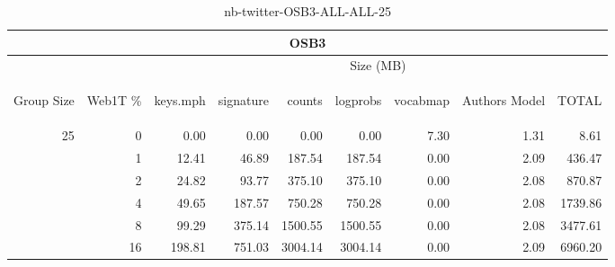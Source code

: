 \begin{center}
\begin{table}[htbp] 
 \begin{center}
\begin{tabular}{ | r | r | r | r | r | r | r | r | r |}
\hline
\multicolumn{9}{|c|}{OSB3}\\
\hline
 & & \multicolumn{7}{|c|}{Size (MB)}\\ \cline{3-9}
\begin{sideways}Group Size\end{sideways} & \begin{sideways}Web1T \% \end{sideways} & \begin{sideways}keys.mph\end{sideways} & \begin{sideways}signature\end{sideways} & \begin{sideways}counts\end{sideways} & \begin{sideways}logprobs\end{sideways} & \begin{sideways}vocabmap\end{sideways} & \begin{sideways}Authors Model \end{sideways} & \begin{sideways}TOTAL\end{sideways}\\
\hline
\multirow{5}{*}{25}
 & 0 & 0.00 & 0.00 & 0.00 & 0.00 & 7.30 & 1.31 & 8.61\\ \cline{2-9}
 & 1 & 12.41 & 46.89 & 187.54 & 187.54 & 0.00 & 2.09 & 436.47\\ \cline{2-9}
 & 2 & 24.82 & 93.77 & 375.10 & 375.10 & 0.00 & 2.08 & 870.87\\ \cline{2-9}
 & 4 & 49.65 & 187.57 & 750.28 & 750.28 & 0.00 & 2.08 & 1739.86\\ \cline{2-9}
 & 8 & 99.29 & 375.14 & 1500.55 & 1500.55 & 0.00 & 2.08 & 3477.61\\ \cline{2-9}
 & 16 & 198.81 & 751.03 & 3004.14 & 3004.14 & 0.00 & 2.09 & 6960.20\\ \cline{2-9}
\hline
\end{tabular}
\caption{nb-twitter-OSB3-ALL-ALL-25}
\label{table:nb-twitter-OSB3-ALL-ALL-25}
\end{center}
 \end{table}
\end{center}

